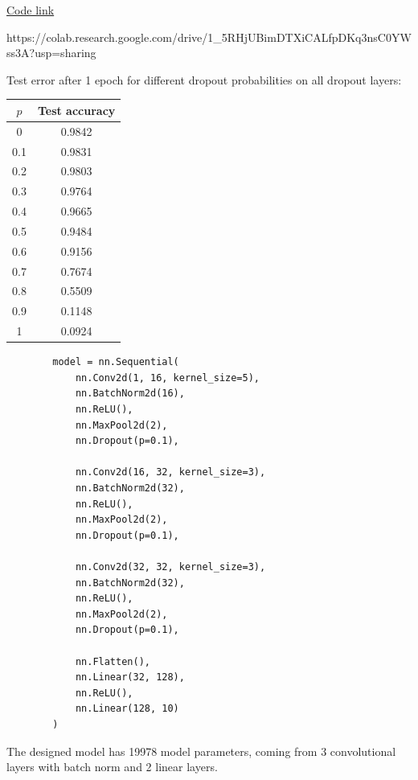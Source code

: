 \newpage

\begin{solution}
    \href{https://colab.research.google.com/drive/1_5RHjUBimDTXiCALfpDKq3nsC0YWss3A?usp=sharing}{Code link}

    https://colab.research.google.com/drive/1_5RHjUBimDTXiCALfpDKq3nsC0YWss3A?usp=sharing

    Test error after 1 epoch for different dropout probabilities on all dropout layers:
    \begin{center}
        \begin{tabular}{|c|c|}
            \hline
            $p$ & Test accuracy\\
            \hline
            0 & 0.9842\\
            0.1 & 0.9831\\
            0.2 & 0.9803\\
            0.3 & 0.9764\\
            0.4 & 0.9665\\
            0.5 & 0.9484\\
            0.6 & 0.9156\\
            0.7 & 0.7674\\
            0.8 & 0.5509\\
            0.9 & 0.1148\\
            1 & 0.0924\\
            \hline  
        \end{tabular}
    \end{center}

    \begin{verbatim}
        model = nn.Sequential(
            nn.Conv2d(1, 16, kernel_size=5),
            nn.BatchNorm2d(16),
            nn.ReLU(),
            nn.MaxPool2d(2),
            nn.Dropout(p=0.1),
            
            nn.Conv2d(16, 32, kernel_size=3),
            nn.BatchNorm2d(32),
            nn.ReLU(),
            nn.MaxPool2d(2),
            nn.Dropout(p=0.1),
        
            nn.Conv2d(32, 32, kernel_size=3),
            nn.BatchNorm2d(32),
            nn.ReLU(),
            nn.MaxPool2d(2),
            nn.Dropout(p=0.1),
            
            nn.Flatten(),
            nn.Linear(32, 128),
            nn.ReLU(),
            nn.Linear(128, 10)
        )
    \end{verbatim}

    The designed model has 19978 model parameters, coming from 3 convolutional layers with batch norm and 2 linear layers.


\end{solution}
